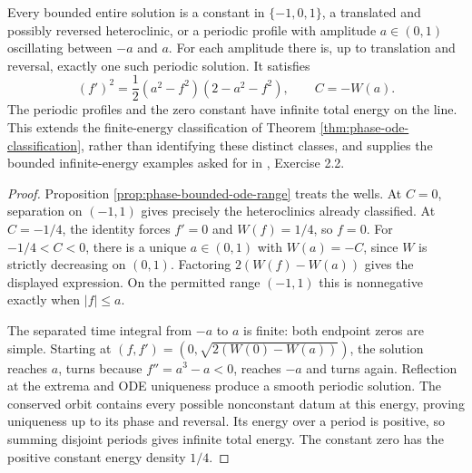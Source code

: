 \begin{theorem}\label{thm:phase-bounded-ode-classification}
Every bounded entire solution is a constant in $\{-1,0,1\}$, a translated and possibly reversed heteroclinic, or a periodic profile with amplitude $a\in(0,1)$ oscillating between $-a$ and $a$. For each amplitude there is, up to translation and reversal, exactly one such periodic solution. It satisfies
\[
 (f')^2=\frac12(a^2-f^2)(2-a^2-f^2),\qquad C=-W(a).
\]
The periodic profiles and the zero constant have infinite total energy on the line. This extends the finite-energy classification of Theorem \ref{thm:phase-ode-classification}, rather than identifying these distinct classes, and supplies the bounded infinite-energy examples asked for in \cite{ChAC}, Exercise 2.2.
\end{theorem}
\begin{proof}
Proposition \ref{prop:phase-bounded-ode-range} treats the wells. At $C=0$, separation on $(-1,1)$ gives precisely the heteroclinics already classified. At $C=-1/4$, the identity forces $f'=0$ and $W(f)=1/4$, so $f=0$. For $-1/4<C<0$, there is a unique $a\in(0,1)$ with $W(a)=-C$, since $W$ is strictly decreasing on $(0,1)$. Factoring $2(W(f)-W(a))$ gives the displayed expression. On the permitted range $(-1,1)$ this is nonnegative exactly when $|f|\leq a$.

The separated time integral from $-a$ to $a$ is finite: both endpoint zeros are simple. Starting at $(f,f')=(0,\sqrt{2(W(0)-W(a))})$, the solution reaches $a$, turns because $f''=a^3-a<0$, reaches $-a$ and turns again. Reflection at the extrema and ODE uniqueness produce a smooth periodic solution. The conserved orbit contains every possible nonconstant datum at this energy, proving uniqueness up to its phase and reversal. Its energy over a period is positive, so summing disjoint periods gives infinite total energy. The constant zero has the positive constant energy density $1/4$.
\end{proof}

